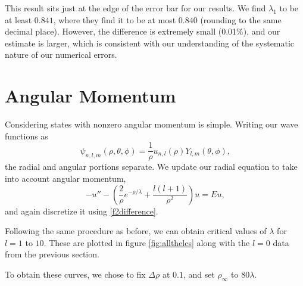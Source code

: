 \documentclass[12pt,twoside]{reedthesis}
\newcommand{\eqn}[1]{\begin{equation}#1\end{equation}}
\begin{document}
This result sits just at the edge of the error bar for our results. We find $\lambda_1$ to be at least $0.841$, where they find it to be at most $0.840$ (rounding to the same decimal place). However, the difference is extremely small (0.01\%), and our estimate is larger, which is consistent with our understanding of the systematic nature of our numerical errors. 

\section{Angular Momentum}

Considering states with nonzero angular momentum is simple. Writing our wave functions as
\eqn{
\psi_{n,l,m} (\rho,\theta,\phi) = \frac{1}{\rho}u_{n,l}(\rho) Y_{l,m}(\theta, \phi)\mbox{,}
}
the radial and angular portions separate. We update our radial equation to take into account angular momentum,
\eqn{
-u'' - \left(\frac{2}{\rho}e^{-\rho/\lambda} + \frac{l(l+1)}{\rho^2}\right) u = E u\mbox{,}
\label{eq:angmomentum}
}
and again discretize it using \eqref{f2difference}. 

Following the same procedure as before, we can obtain critical values of $\lambda$ for $l = 1$ to $10$. These are plotted in figure \ref{fig:allthelcs} along with the $l = 0$ data from the previous section.

To obtain these curves, we chose to fix $\Delta \rho$ at $0.1$, and set $\rho_{\infty}$ to $80 \lambda$.
\end{document}
